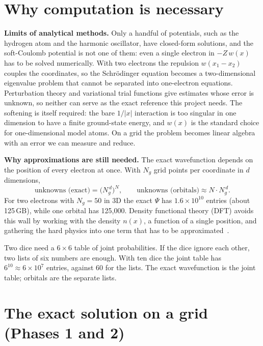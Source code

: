 \documentclass[11pt,a4paper]{article}
\begin{document}
\section{Why computation is necessary}\label{sec:why}

\textbf{Limits of analytical methods.} Only a handful of potentials, such as the hydrogen atom and the harmonic
oscillator, have closed-form solutions, and the soft-Coulomb potential is not one of them: even a single
electron in $-Z\,w(x)$ has to be solved numerically. With two electrons the repulsion $w(x_1-x_2)$ couples the
coordinates, so the Schr\"odinger equation becomes a two-dimensional eigenvalue problem that cannot be separated
into one-electron equations. Perturbation theory and variational trial functions give estimates whose error
is unknown, so neither can serve as the exact reference this project needs.
The softening is itself required: the bare $1/|x|$ interaction is too singular in one dimension to have a finite
ground-state energy, and $w(x)$ is the standard choice for one-dimensional model atoms. On a grid the problem
becomes linear algebra with an error we can measure and reduce.

\textbf{Why approximations are still needed.} The exact wavefunction depends on the position of every electron at
once. With $N_g$ grid points per
coordinate in $d$ dimensions,
\begin{equation}
  \text{unknowns (exact)}=\big(N_g^{\,d}\big)^{N},\qquad \text{unknowns (orbitals)}\approx N\cdot N_g^{\,d}.
\end{equation}
For two electrons with $N_g=50$ in 3D the exact $\Psi$ has $1.6\times10^{10}$ entries (about 125\,GB), while one
orbital has 125{,}000. Density functional theory (DFT) avoids this wall by working with the density $n(x)$, a
function of a single position, and gathering the hard physics into one term that has to be
approximated~\cite{kohn,capelle}.

\begin{plainwords}
Two dice need a $6\times6$ table of joint probabilities. If the dice ignore each other, two lists of six
numbers are enough. With ten dice the joint table has $6^{10}\approx6\times10^{7}$ entries, against 60 for the
lists. The exact wavefunction is the joint table; orbitals are the separate lists.
\end{plainwords}

\section{The exact solution on a grid (Phases 1 and 2)}
\end{document}
